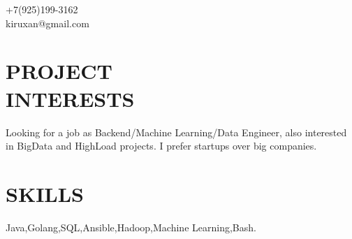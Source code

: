 \documentclass[margin,line]{resume}
\begin{document}
\vspace{50mm}
{
	\sc
    \hfill +7(925)199-3162                  \vspace{0mm}\\\vspace{0mm}%
    \hfill kiruxan@gmail.com            \vspace{0mm}\\\vspace{-10mm}%
\vspace{1mm}
}


\begin{resume}

\vspace{1mm}

    \section{\mysidestyle \textbf{\large{P}\small{ROJECT\\INTERESTS}}}

	Looking for a job as Backend/Machine Learning/Data Engineer, also interested in BigData and HighLoad projects. I prefer startups over big companies.


\sectionline

    \section{\mysidestyle \textbf{\large{S}\small{KILLS}}}

    Java,\hspace{2mm}Golang,\hspace{2mm}SQL,\hspace{2mm}Ansible,\hspace{2mm}Hadoop,\hspace{2mm}Machine Learning,\hspace{2mm}Bash.


\sectionline


\end{resume}
\end{document}

